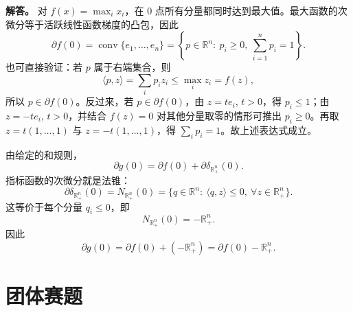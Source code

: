 ﻿\documentclass[UTF8,12pt]{ctexart}
\begin{document}
\begin{enumerate}[label=\textbf{\arabic*.},leftmargin=2.2em]
\textbf{解答。} 对 \(f(x)=\max_i x_i\)，在 \(0\) 点所有分量都同时达到最大值。最大函数的次微分等于活跃线性函数梯度的凸包，因此
\[
\partial f(0)=\operatorname{conv}\{e_1,\ldots,e_n\}
=\left\{p\in\mathbb R^n:\ p_i\ge0,\ \sum_{i=1}^n p_i=1\right\}.
\]
也可直接验证：若 \(p\) 属于右端集合，则
\[
\langle p,z\rangle=\sum_i p_iz_i\le \max_i z_i=f(z),
\]
所以 \(p\in\partial f(0)\)。反过来，若 \(p\in\partial f(0)\)，由 \(z=te_i\), \(t>0\)，得 \(p_i\le1\)；由 \(z=-te_i\), \(t>0\)，并结合 \(f(z)=0\) 对其他分量取零的情形可推出 \(p_i\ge0\)。再取 \(z=t(1,\ldots,1)\) 与 \(z=-t(1,\ldots,1)\)，得 \(\sum_i p_i=1\)。故上述表达式成立。

由给定的和规则，
\[
\partial g(0)=\partial f(0)+\partial\delta_{\mathbb R_+^n}(0).
\]
指标函数的次微分就是法锥：
\[
\partial\delta_{\mathbb R_+^n}(0)
=N_{\mathbb R_+^n}(0)
=\{q\in\mathbb R^n:\ \langle q,z\rangle\le0,\ \forall z\in\mathbb R_+^n\}.
\]
这等价于每个分量 \(q_i\le0\)，即
\[
N_{\mathbb R_+^n}(0)=-\mathbb R_+^n.
\]
因此
\[
\partial g(0)=\partial f(0)+(-\mathbb R_+^n)
=\partial f(0)-\mathbb R_+^n.
\]
\end{enumerate}

\section{团体赛题}
\end{document}
